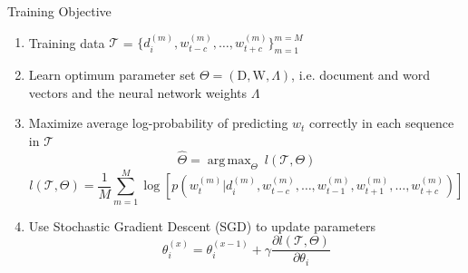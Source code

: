\documentclass[10pt]{beamer}
\DeclareMathOperator*{\argmax}{arg\,max}
\newcommand{\matD}{\ensuremath{\mathrm{D}} }
\newcommand{\matW}{\ensuremath{\mathrm{W}} }
\newcommand{\traindata}{\ensuremath{\mathcal{T}}}
\begin{document}

\begin{frame}{Training Objective}
\vfill
\begin{enumerate}
	\vfill\item<1-> Training data $\traindata$ = $\{d^{(m)}_{i}, w^{(m)}_{t-c}, \ldots, w^{(m)}_{t+c}\}^{m=M}_{m=1}$
	\vfill\item<2-> Learn optimum parameter set $\Theta = (\matD, \matW, \Lambda)$, i.e. document and word vectors and the neural network weights $\Lambda$ 
	\vfill\item<2-> Maximize average log-probability of predicting $w_{t}$ correctly in each sequence in $\traindata$
					\begin{equation}
						\hat{\Theta} =  \argmax_{\Theta}~l(\traindata, \Theta)
					\end{equation}
					\begin{equation}
						l(\traindata, \Theta) = \frac{1}{M}\sum_{m=1}^{M} \log \left[p(w^{(m)}_{t} | d^{(m)}_{i}, w^{(m)}_{t-c}, \ldots, w^{(m)}_{t-1}, w^{(m)}_{t+1}, \ldots, w^{(m)}_{t+c})\right]
					\end{equation}
	\vfill\item<3-> Use Stochastic Gradient Descent (SGD) to update parameters
					\begin{equation}
						\theta^{(x)}_{i} = \theta^{(x-1)}_{i} + \gamma\frac{\partial l(\traindata, \Theta)}{\partial \theta_{i}}
					\end{equation}
\end{enumerate}
	

\end{frame}

\end{document}
